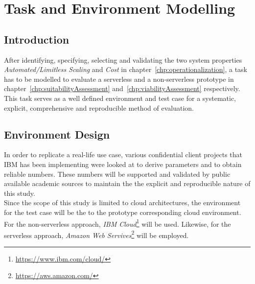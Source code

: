 \chapter{Task and Environment Modelling}\label{chp:environmentTaskModelling}


\section{Introduction}

After identifying, specifying, selecting and validating the two system properties \textit{Automated/Limitless Scaling} and \textit{Cost} in chapter~\vref{chp:operationalization}, a task has to be modelled to evaluate a serverless and a non-serverless prototype in chapter~\vref{chp:suitabilityAssessment} and~\vref{chp:viabilityAssessment} respectively. This task serves as a well defined environment and test case for a systematic, explicit, comprehensive and reproducible method of evaluation. 

\section{Environment Design}

In order to replicate a real-life use case, various confidential client projects that IBM has been implementing were looked at to derive parameters and to obtain reliable numbers. These numbers will be supported and validated by public available academic sources to maintain the the explicit and reproducible nature of this study.\\
Since the scope of this study is limited to cloud architectures, the environment for the test case will be the to the prototype corresponding cloud environment. For the non-serverless approach, \textit{IBM Cloud}\footnote{\url{https://www.ibm.com/cloud/}} will be used. Likewise, for the serverless approach, \textit{Amazon Web Servives}\footnote{\url{https://aws.amazon.com/}} will be employed. 

